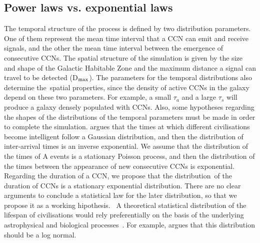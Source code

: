 \documentclass[crop]{CSLB}
\newcommand{\ceti}{CCN}
\newcommand{\cetis}{CCNs}
\begin{document}
    

\subsection{Power laws vs. exponential laws}\label{SS_PDF_shape}

The temporal structure of the process is defined by two distribution parameters. One of them represent the mean time
interval that a \ceti{} can emit and receive signals, and the other the mean time interval between the emergence of
consecutive \cetis{}. The spatial structure of the simulation is given by the size and shape of the Galactic Habitable
Zone and the maximum distance a signal can travel to be detected
(D$_{\rm max}$). The parameters for the temporal
distributions also determine the spatial properties, since the density of active \cetis{} in the galaxy depend on these
two parameters. For example, a small $\tau_a$ and a large $\tau_s$ will produce a galaxy densely populated with
\cetis{}. Also, some hypotheses regarding the shapes of the distributions of the temporal parameters must be made in
order to complete the simulation. \citet{forgan_spatiotemporal_2011} argues that the times at which different
civilisations become intelligent follow a Gaussian distribution, and then the distribution of inter-arrival times is an
inverse exponential. We assume that the distribution of the times of A events is a stationary Poisson process, and then
the distribution of the times between the appearance of new consecutive \cetis{} is exponential. Regarding the duration
of a \ceti{}, we propose that the distribution of the duration of \cetis{} is a stationary exponential distribution.
There are no clear arguments to conclude a statistical law for the later distribution, so that we propose it as a
working hipothesis.  A theoretical statistical distribution of the lifespan of civilisations would rely preferentially
on the basis of the underlying astrophysical and biological processes \citep{balbi_impact_2018}. For example,
\citet{maccone_lognormals_2014} argues that this distribution should be a log normal. 
\end{document}
